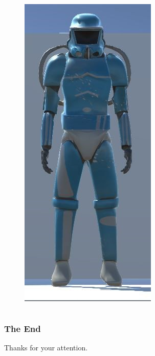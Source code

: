 \documentclass[xcolor=dvipsnames]{beamer}
\begin{document}
\begin{frame}
\begin{columns}[T]
\begin{column}{0.3\textwidth}
\begin{figure}[ht]
					\includegraphics[scale=0.455]{images/interim/character}
				\end{figure}
			\end{column}
		\end{columns}
	\end{frame}
	
	\begin{frame}
		\frametitle{The End}
		\centering
		\Huge
		Thanks for your attention.
	\end{frame}
\end{document}
